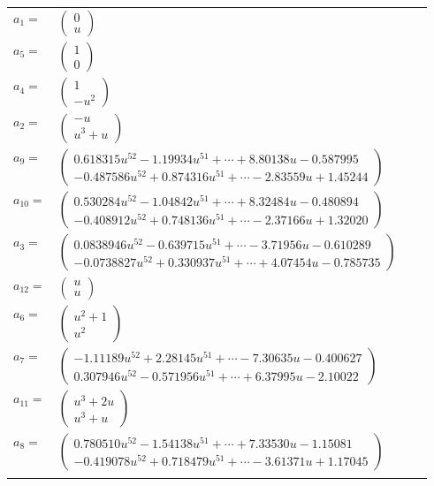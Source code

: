 \documentclass[1p]{elsarticle_modified}
\theoremstyle{definition}
\begin{document}
\begin{tabular}{m{7pt} m{180pt} m{7pt} m{180pt} }
\flushright $a_{1}=$&$\begin{pmatrix}0\\u\end{pmatrix}$ \\
\flushright $a_{5}=$&$\begin{pmatrix}1\\0\end{pmatrix}$ \\
\flushright $a_{4}=$&$\begin{pmatrix}1\\- u^2\end{pmatrix}$ \\
\flushright $a_{2}=$&$\begin{pmatrix}- u\\u^3+u\end{pmatrix}$ \\
\flushright $a_{9}=$&$\begin{pmatrix}0.618315 u^{52}-1.19934 u^{51}+\cdots+8.80138 u-0.587995\\-0.487586 u^{52}+0.874316 u^{51}+\cdots-2.83559 u+1.45244\end{pmatrix}$ \\
\flushright $a_{10}=$&$\begin{pmatrix}0.530284 u^{52}-1.04842 u^{51}+\cdots+8.32484 u-0.480894\\-0.408912 u^{52}+0.748136 u^{51}+\cdots-2.37166 u+1.32020\end{pmatrix}$ \\
\flushright $a_{3}=$&$\begin{pmatrix}0.0838946 u^{52}-0.639715 u^{51}+\cdots-3.71956 u-0.610289\\-0.0738827 u^{52}+0.330937 u^{51}+\cdots+4.07454 u-0.785735\end{pmatrix}$ \\
\flushright $a_{12}=$&$\begin{pmatrix}u\\u\end{pmatrix}$ \\
\flushright $a_{6}=$&$\begin{pmatrix}u^2+1\\u^2\end{pmatrix}$ \\
\flushright $a_{7}=$&$\begin{pmatrix}-1.11189 u^{52}+2.28145 u^{51}+\cdots-7.30635 u-0.400627\\0.307946 u^{52}-0.571956 u^{51}+\cdots+6.37995 u-2.10022\end{pmatrix}$ \\
\flushright $a_{11}=$&$\begin{pmatrix}u^3+2 u\\u^3+u\end{pmatrix}$ \\
\flushright $a_{8}=$&$\begin{pmatrix}0.780510 u^{52}-1.54138 u^{51}+\cdots+7.33530 u-1.15081\\-0.419078 u^{52}+0.718479 u^{51}+\cdots-3.61371 u+1.17045\end{pmatrix}$\\&\end{tabular}
\end{document}
